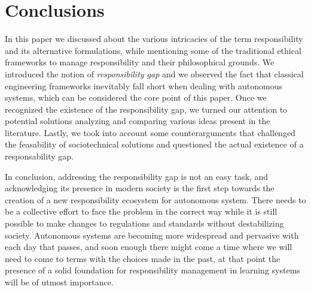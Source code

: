 \section{Conclusions}\label{sec:conclusions}

In this paper we discussed about the various intricacies of the term responsibility and its alternative formulations, while mentioning some of the traditional ethical frameworks to manage responsibility and their philosophical grounds.
We introduced the notion of \textit{responsibility gap} and we observed the fact that classical engineering frameworks inevitably fall short when dealing with autonomous systems, which can be considered the core point of this paper.
Once we recognized the existence of the responsibility gap, we turned our attention to potential solutions analyzing and comparing various ideas present in the literature.
Lastly, we took into account some counterarguments that challenged the feasability of sociotechnical solutions and questioned the actual existence of a responsability gap.

In conclusion, addressing the responsibility gap is not an easy task, and acknowledging its presence in modern society is the first step towards the creation of a new responsibility ecosystem for autonomous system.
There needs to be a collective effort to face the problem in the correct way while it is still possible to make changes to regulations and standards without destabilizing society.
Autonomous systems are becoming more widespread and pervasive with each day that passes, and soon enough there might come a time where we will need to come to terms with the choices made in the past, at that point the presence of a solid foundation for responsibility management in learning systems will be of utmost importance.